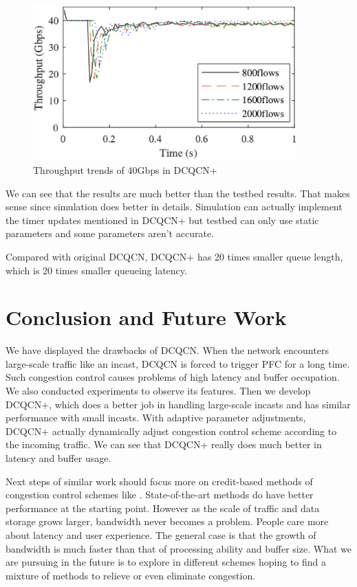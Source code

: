 \documentclass[12pt,a4paper]{article}
\begin{document}
\begin{figure}[h!]
	\begin{center}
		\includegraphics[width=4in]{simt40}
		\caption{Throughput trends of 40Gbps in DCQCN+}
		\label{fig:simt40}
	\end{center}
\end{figure}

We can see that the results are much better than the testbed results.
That makes sense since simulation does better in details.
Simulation can actually implement the timer updates mentioned in DCQCN+ but testbed can only use static parameters and some parameters
aren't accurate.

Compared with original DCQCN, DCQCN+ has 20 times smaller queue length, which is 20 times smaller queueing latency.


\newpage
\section{Conclusion and Future Work}

We have displayed the drawbacks of DCQCN.
When the network encounters large-scale traffic like an incast, DCQCN is forced to trigger PFC for a long time.
Such congestion control causes problems of high latency and buffer occupation.
We also conducted experiments to observe its features.
Then we develop DCQCN+, which does a better job in handling large-scale incasts and has similar performance with small incasts.
With adaptive parameter adjustments, DCQCN+ actually dynamically adjust congestion control scheme according to the incoming traffic.
We can see that DCQCN+ really does much better in latency and buffer usage.

Next steps of similar work should focus more on credit-based methods of congestion control schemes like \cite{credit}.
State-of-the-art methods do have better performance at the starting point.
However as the scale of traffic and data storage grows larger, bandwidth never becomes a problem.
People care more about latency and user experience.
The general case is that the growth of bandwidth is much faster than that of processing ability and buffer size.
What we are pursuing in the future is to explore in different schemes hoping to find a mixture of methods to relieve or even eliminate congestion.
\end{document}
